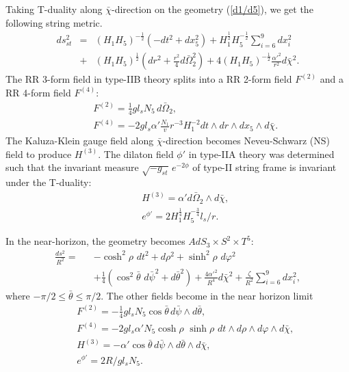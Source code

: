 \documentclass[a4paper,12pt]{article}
\begin{document}
Taking T-duality along $\bar{\chi}$-direction on the geometry (\ref{d1/d5}), we get the following string metric.
\begin{eqnarray}
ds_{st}^2&=&(H_1H_5)^{-\frac{1}{2}}\left(-dt^2+dx_5^2\right)+H_1^{\frac{1}{2}}H_5^{-\frac{1}{2}}\sum\limits_{i=6}^{9}dx_i^2\nonumber\\
&+&(H_1H_5)^{\frac{1}{2}}\left(dr^2+\frac{r^2}{4}d\bar{\Omega}_2^2\right)+4(H_1H_5)^{-\frac{1}{2}}\frac{\alpha'^2}{r^2}d\bar{\chi}^2.
\end{eqnarray}
The RR 3-form field in type-IIB theory splits into a RR 2-form field $F^{(2)}$ and a RR 4-form field $F^{(4)}$:
\begin{eqnarray}
&&F^{(2)}=\frac{1}{4}gl_sN_5 \,d\bar{\Omega}_2,\nonumber\\
&&F^{(4)}=-2gl_s\alpha'\frac{N_1}{v}r^{-3}H_1^{-2}dt\wedge dr\wedge dx_5\wedge d\bar{\chi}.
\end{eqnarray}
The Kaluza-Klein gauge field along $\bar{\chi}$-direction becomes Neveu-Schwarz (NS) field to produce $H^{(3)}$. The dilaton field $\phi'$ in type-IIA theory was determined such that the invariant measure $\sqrt{-g_{st}}\,e^{-2\phi}$ of type-II string frame is invariant under the T-duality:
\begin{eqnarray}
&&H^{(3)}=\alpha'd\bar{\Omega}_2\wedge d\bar{\chi},\nonumber\\
&&e^{\phi'}=2H_1^{\frac{1}{4}}H_5^{-\frac{3}{4}}l_s/r.
\end{eqnarray}

In the near-horizon, the geometry becomes $AdS_3\times S^2\times T^5$:
\begin{eqnarray}
\frac{ds^2}{R^2}=&&-\cosh^2\rho\,\, dt^2+d\rho^2+\sinh^2\rho \,\,d\varphi^2\nonumber\\
&&+\frac{1}{4}\left(\cos^2{\bar{\theta}}\,\,d\bar{\psi}^2+d\bar{\theta}^2\right)+\frac{4\alpha'^2}{R^4}d\bar{\chi}^2+\frac{\zeta}{R^2}\sum\limits_{i=6}^{9}dx_i^2,
\end{eqnarray} 
where $-\pi/2\le\bar{\theta}\le \pi/2$. 
The other fields become in the near horizon limit
\begin{eqnarray}
&&F^{(2)}=-\frac{1}{4}gl_sN_5\cos{\bar{\theta}}\,d\bar{\psi} \wedge d\bar{\theta},\nonumber\\
&&F^{(4)}=-2gl_s\alpha'N_5\cosh{\rho}\,\,\sinh{\rho}\,\,dt\wedge d\rho\wedge d\varphi \wedge d\bar{\chi},\nonumber\\
&&H^{(3)}=-\alpha'\cos{\bar{\theta}}\,d\bar{\psi} \wedge d\bar{\theta} \wedge d\bar{\chi},\nonumber\\
&&e^{\phi'}=2R/gl_sN_5.
\end{eqnarray}
\end{document}
